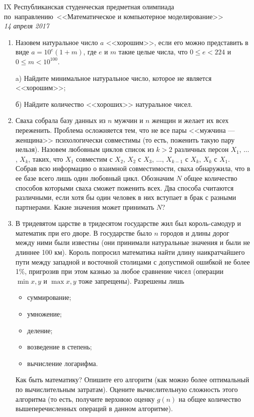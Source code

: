 \documentclass[11pt, a4paper]{article}
\newcommand{\head}[4]
{
	\fancyhf{}
	\pagestyle{fancy}
	\chead{#3, #4}

	\begin{center}
	\begin{large}
	#1 \\
	\textit{#2}\\
	\end{large}
	\end{center}

}
\begin{document}
\head{IX Республиканская студенческая предметная олимпиада по~направлению~<<Математическое и компьютерное моделирование>>}{14 апреля 2017}{Назарбаев Университет}{г. Астана}

\begin{enumerate}
\item Назовем натуральное число $a$ <<хорошим>>, если его можно представить в виде $a = 10^e (1+m)$, где $e$ и $m$ такие целые числа, что $0 \leqslant e < 224$ и $0 \leqslant m < 10^{100}$.

a) Найдите минимальное натуральное число, которое не является <<хорошим>>;

б) Найдите количество <<хороших>> натуральное чисел.

\item Сваха собрала базу данных из $n$ мужчин и $n$ женщин и желает их всех
переженить. Проблема осложняется тем, что не все пары <<мужчина --- женщина>> психологически совместимы (то есть, поженить такую пару нельзя). Назовем любовным циклов список из $k > 2$ различных персон $X_1$, $\dots$, $X_k$, таких, что $X_1$ совместим с $X_2$, $X_2$ с $X_3$, $\dots$, $X_{k-1}$ с $X_k$, $X_k$ с $X_1$. Собрав всю информацию о взаимной совместимости, сваха обнаружила, что в ее базе всего лишь один любовный цикл. Обозначим $N$ общее количество способов которыми сваха сможет поженить всех. Два способа считаются различными, если хотя бы один человек в них вступает в брак с разными партнерами. Какие значения может принимать $N$?

\item В тридевятом царстве в тридесятом государстве жил был король-самодур и математик при его дворе. В государстве было $n$ городов и длины дорог между ними были известны (они принимали натуральные значения и были не длиннее 100 км). Король попросил математика найти длину наикратчайшего пути между западной и восточной столицами с допустимой ошибкой не более 1\%, пригрозив при этом казнью за любое сравнение чисел (операции $\min{x, y}$ и $\max{x, y}$ тоже запрещены). Разрешены лишь 
\begin{itemize}
\item суммирование;
\item умножение;
\item деление;
\item возведение в степень;
\item вычисление логарифма.
\end{itemize}
Как быть математику? Опишите его алгоритм (как можно более оптимальный по вычислительным затратам). Оцените вычислительную сложность этого алгоритма (то есть, получите верхнюю оценку $g(n)$ на общее количество вышеперечисленных операций в данном алгоритме).


\end{enumerate}
\end{document}
